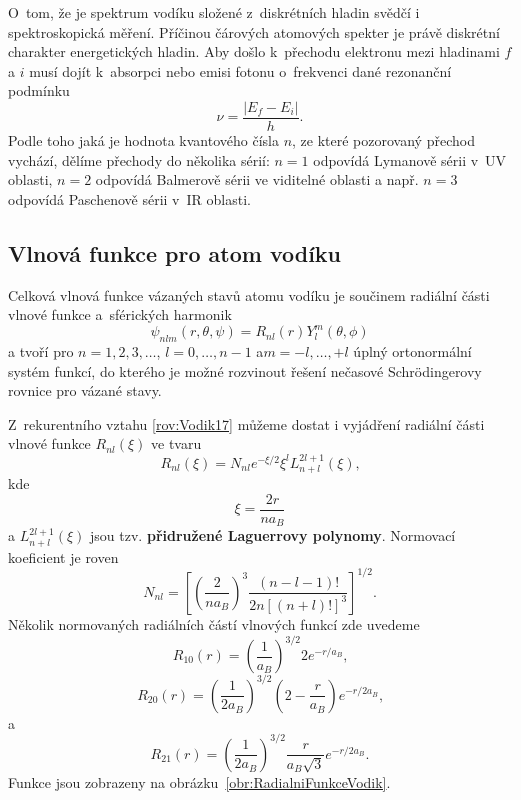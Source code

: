 O~tom, že je spektrum vodíku složené z~diskrétních hladin svědčí i spektroskopická měření. Příčinou čárových atomových spekter je právě diskrétní charakter energetických hladin. Aby došlo k~přechodu elektronu mezi hladinami $f$ a $i$ musí dojít k~absorpci nebo emisi fotonu o~frekvenci dané rezonanční podmínku
\begin{equation}
\nu = \frac{|E_f-E_i|}{h} \mbox{.}
\label{rov:Vodik26}
\end{equation}
Podle toho jaká je hodnota kvantového čísla $n$, ze které pozorovaný přechod vychází, dělíme přechody do několika sérií: $n=1$ odpovídá Lymanově sérii v~UV oblasti, $n=2$ odpovídá Balmerově sérii ve viditelné oblasti a např. $n=3$ odpovídá Paschenově sérii v~IR oblasti.

\subsection{Vlnová funkce pro atom vodíku}
\label{kap:VlnovaFunkceVodik}

Celková vlnová funkce vázaných stavů atomu vodíku je součinem radiální části vlnové funkce a~sférických harmonik
\begin{equation}
\psi_{nlm}(r,\theta,\psi) = R_{nl}(r)Y_l^m(\theta, \phi)
\label{rov:Vodik30}
\end{equation}
a tvoří pro $n=1,2,3, \dots$, $l=0,\dots,n-1$ a$m=-l,\dots,+l$ úplný ortonormální systém funkcí, do kterého je možné rozvinout řešení nečasové Schrödingerovy rovnice pro vázané stavy.

Z~rekurentního vztahu \eqref{rov:Vodik17} můžeme dostat i vyjádření radiální části vlnové funkce $R_{nl}(\xi)$ ve tvaru
\begin{equation}
R_{nl}(\xi) = N_{nl} e^{-\xi/2}\xi^l L_{n+l}^{2l+1}(\xi) \mbox{,}
\label{rov:Vodik27}
\end{equation}
kde
\begin{equation}
\xi = \frac{2r}{n a_B}
\label{rov:Vodik28}
\end{equation}
a $L_{n+l}^{2l+1}(\xi)$ jsou tzv. \textbf{přidružené Laguerrovy polynomy}. Normovací koeficient je roven
\begin{equation}
N_{nl} = \left[ \left( \frac{2}{n a_B} \right)^3 \frac{(n-l-1)!}{2n[(n+l)!]^3}\right]^{1/2} \mbox{.}
\label{rov:Vodik29}
\end{equation}
Několik normovaných radiálních částí vlnových funkcí zde uvedeme
\begin{equation}
R_{10}(r) = \left( \frac{1}{a_B}\right) ^{3/2} 2 e^{-r/a_B} \mbox{,}
\end{equation}
\begin{equation}
R_{20}(r) = \left( \frac{1}{2a_B}\right) ^{3/2} \left(2-\frac{r}{a_B}\right) e^{-r/2a_B} \mbox{,}
\end{equation}
a
\begin{equation}
R_{21}(r) = \left( \frac{1}{2a_B}\right) ^{3/2} \frac{r}{a_B \sqrt{3}} e^{-r/2a_B} \mbox{.}
\end{equation}
Funkce jsou zobrazeny na obrázku~\ref{obr:RadialniFunkceVodik}.

